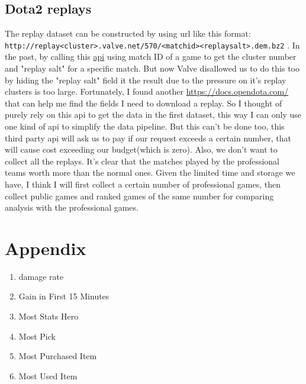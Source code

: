 \documentclass{article}
\newcommand{\codeinline}[1]{
    \texttt{#1}
}
\begin{document}
\subsection{Dota2 replays}
The replay dataset can be constructed by using url like this format: \\
\codeinline{http://replay<cluster>.valve.net/570/<matchid><replaysalt>.dem.bz2}. In the past, by calling this \href{https://wiki.teamfortress.com/wiki/WebAPI/GetMatchDetails}{api} using match ID of a game to get the cluster number and "replay salt" for a specific match. But now Valve disallowed us to do this too by hiding the "replay salt" field it the result due to the pressure on it's replay clusters is too large. Fortunately, I found another \href{third-party api}{https://docs.opendota.com/} that can help me find the fields I need to download a replay. So I thought of purely rely on this api to get the data in the first dataset, this way I can only use one kind of api to simplify the data pipeline. But this can't be done too, this third party api will ask us to pay if our request exceeds a certain number, that will cause cost exceeding our budget(which is zero). Also, we don't want to collect all the replays. It's clear that the matches played by the professional teams worth more than the normal ones. Given the limited time and storage we have, I think I will first collect a certain number of professional games, then collect public games and ranked games of the same number for comparing analysis with the professional games.
\printglossary

\section{Appendix}
\begin{enumerate}
    \item damage rate
    \item Gain in First 15 Minutes
    \item Most Stats Hero
    \item Most Pick
    \item Most Purchased Item
    \item Most Used Item
\end{enumerate}
\end{document}
